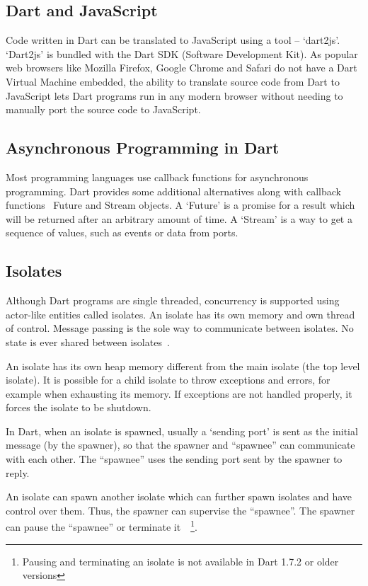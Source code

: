   \subsection{Dart and JavaScript}
  Code written in Dart can be translated to JavaScript using a tool – ‘dart2js’. ‘Dart2js’ is bundled with the Dart SDK (Software Development Kit). As popular web browsers like Mozilla Firefox, Google Chrome and Safari do not have a Dart Virtual Machine embedded, the ability to translate source code from Dart to JavaScript lets Dart programs run in any modern browser without needing to manually port the source code to JavaScript.

  \subsection{Asynchronous Programming in Dart}
  Most programming languages use callback functions for asynchronous programming. Dart provides some additional alternatives along with callback functions \textendash~Future and Stream objects. A ‘Future’ is a promise for a result which will be returned after an arbitrary amount of time. A ‘Stream’ is a way to get a sequence of values, such as events or data from ports.

  \subsection{Isolates}
  \label{sec:isolates}
  Although Dart programs are single threaded, concurrency is supported using actor-like entities called isolates. An isolate has its own memory and own thread of control. Message passing is the sole way to communicate between isolates. No state is ever shared between isolates~\cite{dartEcma}.

  An isolate has its own heap memory different from the main isolate (the top level isolate). It is possible for a child isolate to throw exceptions and errors, for example when exhausting its memory. If exceptions are not handled properly, it forces the isolate to be shutdown.

  In Dart, when an isolate is spawned, usually a ‘sending port’ is sent as the initial message (by the spawner), so that the spawner and “spawnee” can communicate with each other. The “spawnee” uses the sending port sent by the spawner to reply.

  An isolate can spawn another isolate which can further spawn isolates and have control over them. Thus, the spawner can supervise the “spawnee”. The spawner can pause the “spawnee” or terminate it~\cite{dartApiIsolate}~\footnote{Pausing and terminating an isolate is not available in Dart 1.7.2 or older versions}.

